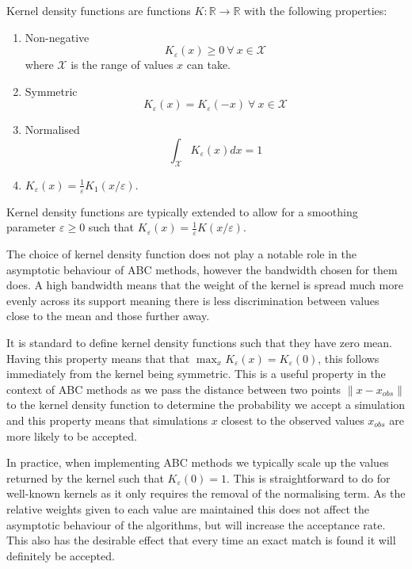 \documentclass[11pt,a4paper]{article}
\theoremstyle{break}
\begin{document}
  \begin{box_definition}
    Kernel density functions are functions $K:\mathbb{R}\to\mathbb{R}$ with the following properties:
    \begin{enumerate}
      \item Non-negative
      \[ K_\varepsilon(x)\geq0\ \forall\ x\in\mathcal{X} \]
      where $\mathcal{X}$ is the range of values $x$ can take.
      \item Symmetric
      \[ K_\varepsilon(x)=K_\varepsilon(-x)\ \forall\ x\in\mathcal{X} \]
      \item Normalised
      \[ \int_{\mathcal{X}}K_\varepsilon(x)dx=1 \]
      \item $K_\varepsilon(x)=\frac1\varepsilon K_1(x/\varepsilon)$.
    \end{enumerate}
    \noindent Kernel density functions are typically extended to allow for a smoothing parameter $\varepsilon\geq0$ such that $K_\varepsilon(x)=\frac1\varepsilon K(x/\varepsilon)$.
  \end{box_definition}

  \par The choice of kernel density function does not play a notable role in the asymptotic behaviour of ABC methods, however the bandwidth chosen for them does. A high bandwidth means that the weight of the kernel is spread much more evenly across its support meaning there is less discrimination between values close to the mean and those further away.

  \par It is standard to define kernel density functions such that they have zero mean. Having this property means that that $\max_xK_\varepsilon(x)=K_\varepsilon(0)$, this follows immediately from the kernel being symmetric. This is a useful property in the context of ABC methods as we pass the distance between two points $\|x-x_{obs}\|$ to the kernel density function to determine the probability we accept a simulation and this property means that simulations $x$ closest to the observed values $x_{obs}$ are more likely to be accepted.

  \par In practice, when implementing ABC methods we typically scale up the values returned by the kernel such that $K_\varepsilon(0)=1$. This is straightforward to do for well-known kernels as it only requires the removal of the normalising term. As the relative weights given to each value are maintained this does not affect the asymptotic behaviour of the algorithms, but will increase the acceptance rate. This also has the desirable effect that every time an exact match is found it will definitely be accepted.
\end{document}

